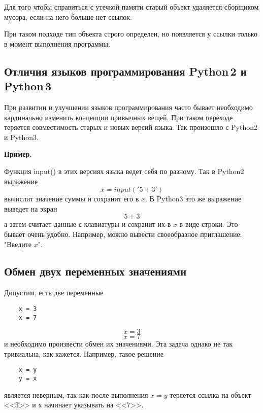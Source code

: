 \documentclass[a4paper, fleqn]{article}
\newenvironment{example}[1][]{\medskip \noindent \textbf{Пример. #1}\par \nopagebreak}{\medskip \par} %
\begin{document}
		Для того чтобы справиться с утечкой памяти старый объект удаляется сборщиком мусора, если на него больше нет ссылок.
		
		При таком подходе тип объекта строго определен, но появляется у ссылки только в момент выполнения программы.
		
		
		
	\subsection*{Отличия языков программирования Python\,2 и Python\,3}
	
		При развитии и улучшении языков программирования часто бывает необходимо кардинально изменить концепции привычных вещей. При таком переходе теряется совместимость старых и новых версий языка. Так произошло с Python2 и Python3. 
		
		\begin{example}
			
			Функция input() в этих версиях языка ведет себя по разному. Так в Python2 выражение
			\[x = input('5 + 3')\]
			вычислит значение суммы и сохранит его в $x$.
			В Python3 это же выражение выведет на экран\\
			\[5 + 3\]
			а затем считает данные с клавиатуры и сохранит их в $x$ в виде строки.
			Это бывает очень удобно. Например, можно вывести своеобразное приглашение: "Введите $x$". 
			
		\end{example}
		
	\subsection*{Обмен двух переменных значениями}
	
	
	Допустим, есть две переменные 
	\begin{lstlisting}
	x = 3
	x = 7
	\end{lstlisting}
	\[x=3\] 
	\[x=7\]
	и необходимо произвести обмен их значениями. Эта задача однако не так тривиальна, как кажется. Например, такое решение 
	\begin{lstlisting}
	x = y
	y = x
	\end{lstlisting}
	является неверным, так как после выполнения $x=y$ теряется ссылка на объект <<3>> и $х$ начинает указывать на <<7>>.
	
\end{document}
